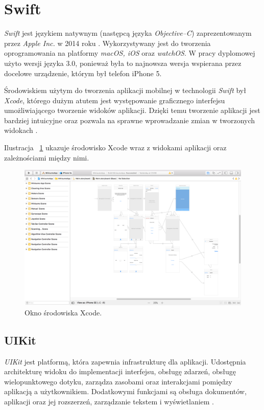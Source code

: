 \newpage

\section{Swift}
\textit{Swift} jest językiem natywnym (następcą języka \textit{Objective–C}) zaprezentowanym przez \textit{Apple Inc.} w 2014 roku \cite{Swiftdoc}. Wykorzystywany jest do tworzenia oprogramowania na platformy \textit{macOS, iOS} oraz \textit{watchOS}. W pracy dyplomowej użyto wersji języka 3.0, ponieważ była to najnowsza wersja wspierana przez docelowe urządzenie, którym był telefon iPhone 5.

Środowiskiem użytym do tworzenia aplikacji mobilnej w technologii \textit{Swift} był \textit{Xcode}, którego dużym atutem jest występowanie graficznego interfejsu umożliwiającego tworzenie widoków aplikacji. Dzięki temu tworzenie aplikacji jest bardziej intuicyjne oraz pozwala na sprawne wprowadzanie zmian w tworzonych widokach \cite{Swift}.

Ilustracja ~\ref{fig:xcode} ukazuje środowisko Xcode wraz z widokami aplikacji oraz zależnościami między nimi.   

\begin{figure}[H]
	\centering
		\includegraphics[width=0.75\linewidth]{pic02/xcode}
	\caption{Okno środowiska Xcode.}
	\label{fig:xcode}	
\end{figure}

\subsection{UIKit}
\textit{UIKit} jest platformą, która zapewnia infrastrukturę dla aplikacji. Udostępnia  architekturę widoku do implementacji interfejsu, obsługę zdarzeń, obsługę wielopunktowego dotyku, zarządza zasobami oraz interakcjami pomiędzy aplikacją a użytkownikiem. Dodatkowymi funkcjami są obsługa dokumentów, aplikacji oraz jej rozszerzeń, zarządzanie tekstem i wyświetlaniem \cite{AppleDocumentation}.

